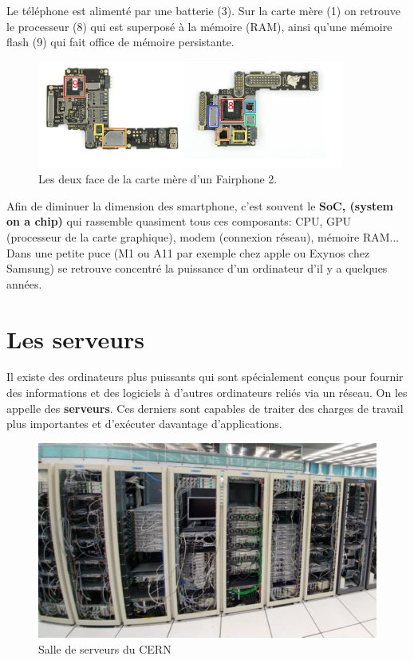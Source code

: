 Le téléphone est alimenté par une batterie (3). Sur la carte mère (1) on retrouve le processeur (8) qui est superposé à la mémoire (RAM), ainsi qu'une mémoire flash (9) qui fait office de mémoire persistante. 
\begin{figure}[h!]
	\centering
	\includegraphics[width=0.9\textwidth]{Images/ordinateur/fairphoneCarteMere.png}
	\caption{Les deux face de la carte mère d'un Fairphone 2.}
\end{figure}

\begin{eclairage}
	Afin de diminuer la dimension des smartphone, c'est souvent le {\bf SoC, (system on a chip)} qui rassemble quasiment tous ces composants: CPU, GPU (processeur de la carte graphique), modem (connexion réseau), mémoire RAM... Dans une petite puce (M1 ou A11 par exemple chez apple ou Exynos chez Samsung) se retrouve concentré la puissance d'un ordinateur d'il y a quelques années.
\end{eclairage}
	

\section{Les serveurs}
Il existe des ordinateurs plus puissants qui sont spécialement conçus pour fournir des informations et des logiciels à d'autres ordinateurs reliés via un réseau. On les appelle des {\bf serveurs}. Ces derniers sont capables de traiter des charges de travail plus importantes et d'exécuter davantage d'applications.

\begin{figure}[h]
	\centering
	\includegraphics[scale=.4]{Images/ordinateur/serveur}
	\caption{Salle de serveurs du CERN}
	\label{serveur}
\end{figure}



